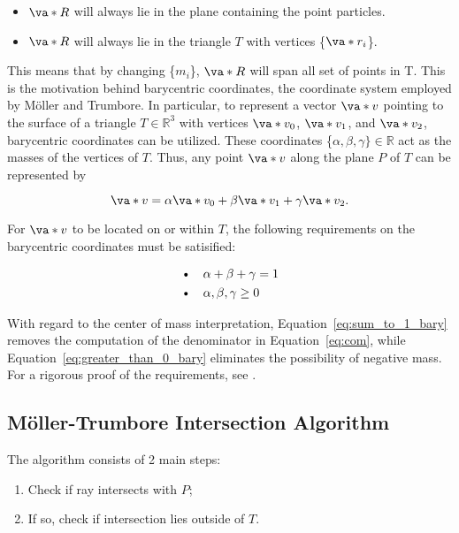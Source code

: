 \begin{itemize}
\item $\va*{R}$ will always lie in the plane containing the point particles.
\item $\va*{R}$ will always lie in the triangle $T$ with vertices \{$\va*{r_i}$\}.
\end{itemize}

\noindent This means that by changing \{$m_i$\}, $\va*{R}$ will span all set of points in T. This is the motivation behind barycentric coordinates, the coordinate system employed by Möller and Trumbore. In particular, to represent a vector $\va*{v}$ pointing to the surface of a triangle $T \in \mathbb{R}^3$ with vertices $\va*{v_0}$, $\va*{v_1}$, and $\va*{v_2}$, barycentric coordinates can be utilized. These coordinates \{$\alpha, \beta, \gamma\}\in \mathbb{R}$ act as the masses of the vertices of $T$. Thus, any point $\va*{v}$ along the plane $P$ of $T$ can be represented by 

\begin{equation}
\va*{v} = \alpha \va*{v_0} + \beta \va*{v_1} + \gamma \va*{v_2}.
\label{eq:v_on_plane_bary}
\end{equation}

\noindent For $\va*{v}$ to be located on or within $T$, the following requirements on the barycentric coordinates must be satisified:

\begin{align}
  &\text{\textbullet}\quad \alpha + \beta + \gamma = 1 \label{eq:sum_to_1_bary}\\
  &\text{\textbullet}\quad \alpha, \beta, \gamma \geq 0 \label{eq:greater_than_0_bary}
\end{align}

With regard to the center of mass interpretation, Equation~\ref{eq:sum_to_1_bary} removes the computation of the denominator in Equation~\ref{eq:com}, while Equation~\ref{eq:greater_than_0_bary} eliminates the possibility of negative mass. For a rigorous proof of the requirements, see \cite{capitan2015barycentric}.

\subsection{Möller-Trumbore Intersection Algorithm} \label{sec:ray_tri_alg}
\par The algorithm consists of 2 main steps:

\begin{enumerate}
  \item Check if ray intersects with $P$;
  \item If so, check if intersection lies outside of $T$.
\end{enumerate}

